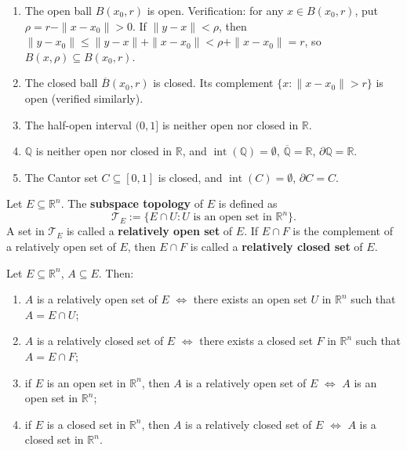 \begin{example}\label{ex:open_closed_examples}
\begin{enumerate}[label=(\roman*)]
    \item The open ball $B(x_0, r)$ is open. Verification: for any $x \in B(x_0, r)$, put $\rho = r - \|x - x_0\| > 0$. If $\|y - x\| < \rho$, then $\|y - x_0\| \le \|y - x\| + \|x - x_0\| < \rho + \|x - x_0\| = r$, so $B(x, \rho) \subseteq B(x_0, r)$.
    \item The closed ball $\overline{B}(x_0, r)$ is closed. Its complement $\{x : \|x - x_0\| > r\}$ is open (verified similarly).
    \item The half-open interval $(0, 1]$ is neither open nor closed in $\mathbb{R}$.
    \item $\mathbb{Q}$ is neither open nor closed in $\mathbb{R}$, and $\operatorname{int}(\mathbb{Q}) = \emptyset$, $\overline{\mathbb{Q}} = \mathbb{R}$, $\partial \mathbb{Q} = \mathbb{R}$.
    \item The Cantor set $C \subseteq [0,1]$ is closed, and $\operatorname{int}(C) = \emptyset$, $\partial C = C$.
\end{enumerate}
\end{example}

\begin{definition}\label{def:subspace_topology}
Let $E \subseteq \mathbb{R}^n$. The \textbf{subspace topology} of $E$ is defined as
\[
\mathcal{T}_E := \{E \cap U : U \text{ is an open set in } \mathbb{R}^n\}.
\]
A set in $\mathcal{T}_E$ is called a \textbf{relatively open set} of $E$. If $E \cap F$ is the complement of a relatively open set of $E$, then $E \cap F$ is called a \textbf{relatively closed set} of $E$.
\end{definition}

\begin{proposition}\label{prop:relative_open_closed}
Let $E \subseteq \mathbb{R}^n$, $A \subseteq E$. Then:
\begin{enumerate}[label=(\roman*)]
    \item $A$ is a relatively open set of $E$ $\iff$ there exists an open set $U$ in $\mathbb{R}^n$ such that $A = E \cap U$;
    \item $A$ is a relatively closed set of $E$ $\iff$ there exists a closed set $F$ in $\mathbb{R}^n$ such that $A = E \cap F$;
    \item if $E$ is an open set in $\mathbb{R}^n$, then $A$ is a relatively open set of $E$ $\iff$ $A$ is an open set in $\mathbb{R}^n$;
    \item if $E$ is a closed set in $\mathbb{R}^n$, then $A$ is a relatively closed set of $E$ $\iff$ $A$ is a closed set in $\mathbb{R}^n$.
\end{enumerate}
\end{proposition}

